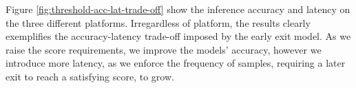 
Figure \ref{fig:threshold-acc-lat-trade-off} show the inference accuracy and latency on the three different platforms. Irregardless of platform, the results clearly exemplifies the accuracy-latency trade-off imposed by the early exit model. As we raise the score requirements, we improve the models' accuracy, however we introduce more latency, as we enforce the frequency of samples, requiring a later exit to reach a satisfying score, to grow. 





